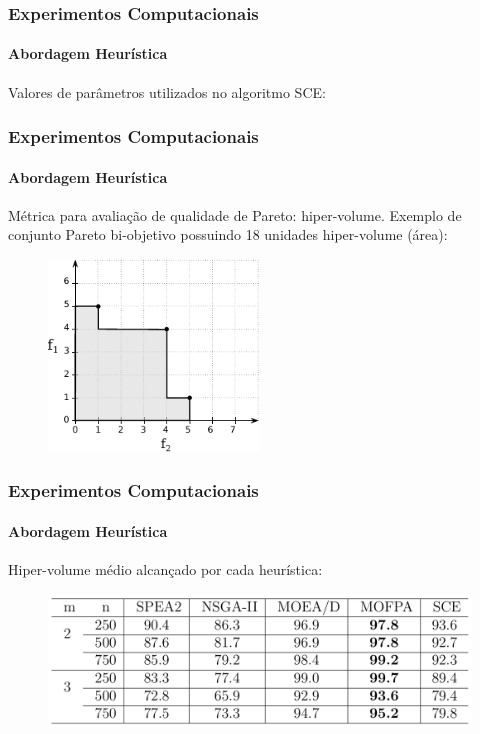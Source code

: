 \documentclass[10pt,xcolor=table,fleqn]{beamer}
\begin{document}
\begin{frame}
  \frametitle{Experimentos Computacionais}
  \framesubtitle{Abordagem Heurística}
  Valores de parâmetros utilizados no algoritmo SCE:
  \begin{table}[H]
    \small
    \centering
    
  \end{table}
\end{frame}

\begin{frame}
  \frametitle{Experimentos Computacionais}
  \framesubtitle{Abordagem Heurística}
  Métrica para avaliação de qualidade de Pareto: hiper-volume.
  \vfill
  Exemplo de conjunto Pareto bi-objetivo possuindo 18 unidades hiper-volume (área):
  \begin{figure}
    \centering
    \includegraphics[width=0.5\textwidth]{../img/sce/hypervol2}
  \end{figure}
\end{frame}

\begin{frame}
  \frametitle{Experimentos Computacionais}
  \framesubtitle{Abordagem Heurística}
  Hiper-volume médio alcançado por cada heurística:
  \begin{figure}
    \centering
    \includegraphics[width=1.0\textwidth]{../tab/sce/zitzler-hvol}
  \end{figure}
\end{frame}
\end{document}
